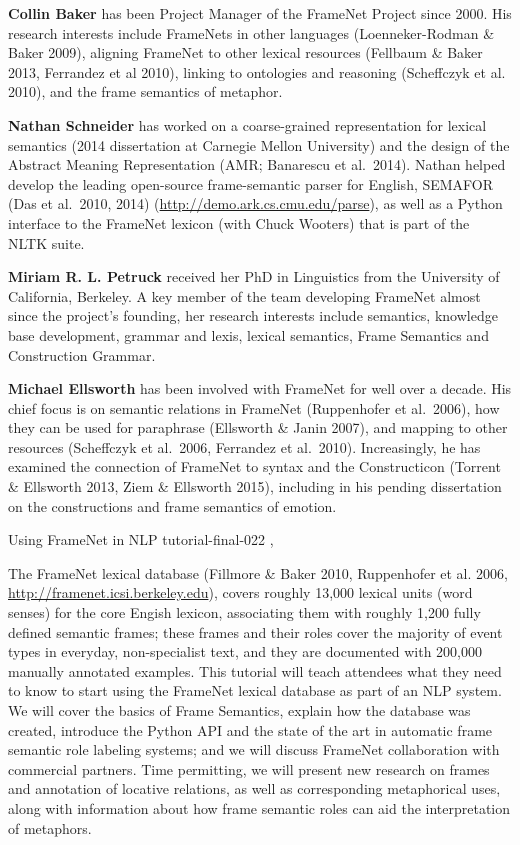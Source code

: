 \begin{bio}
  {\bfseries Collin Baker} has been Project Manager of the FrameNet Project since 2000. His research interests include FrameNets in other languages (Loenneker-Rodman \& Baker 2009), aligning FrameNet to other lexical resources (Fellbaum \& Baker 2013, Ferrandez et al 2010), linking to ontologies and reasoning (Scheffczyk et al. 2010), and the frame semantics of metaphor.

  {\bfseries Nathan Schneider} has worked on a coarse-grained representation for lexical semantics (2014 dissertation at Carnegie Mellon University) and the design of the Abstract Meaning Representation (AMR; Banarescu et al.\ 2014). Nathan helped develop the leading open-source frame-semantic parser for English, SEMAFOR (Das et al.\ 2010, 2014) (\url{http://demo.ark.cs.cmu.edu/parse}), as well as a Python interface to the FrameNet lexicon (with Chuck Wooters) that is part of the NLTK suite.

  {\bfseries Miriam R. L. Petruck} received her PhD in Linguistics from the University of California, Berkeley. A key member of the team developing FrameNet almost since the project’s founding, her research interests include semantics, knowledge base development, grammar and lexis, lexical semantics, Frame Semantics and Construction Grammar.

  {\bfseries Michael Ellsworth}  has been involved with FrameNet for well over a decade. His chief focus is on semantic relations in FrameNet (Ruppenhofer et al.\ 2006), how they can be used for paraphrase (Ellsworth \& Janin 2007), and mapping to other resources (Scheffczyk et al.\ 2006, Ferrandez et al.\ 2010). Increasingly, he has examined the connection of FrameNet to syntax and the Constructicon (Torrent \& Ellsworth 2013, Ziem \& Ellsworth 2015), including in his pending dissertation on the constructions and frame semantics of emotion.
\end{bio}

\begin{tutorial}
  {Using FrameNet in NLP}
  {tutorial-final-022}
  {\daydateyear, \tutorialafternoontime}
  {\TutLocF}

The FrameNet lexical database (Fillmore \& Baker 2010, Ruppenhofer et
al. 2006, \url{http://framenet.icsi.berkeley.edu}), covers roughly
13,000 lexical units (word senses) for the core Engish lexicon,
associating them with roughly 1,200 fully defined semantic frames;
these frames and their roles cover the majority of event types in
everyday, non-specialist text, and they are documented with 200,000
manually annotated examples. This tutorial will teach attendees what
they need to know to start using the FrameNet lexical database as part
of an NLP system. We will cover the basics of Frame Semantics, explain
how the database was created, introduce the Python API and the state
of the art in automatic frame semantic role labeling systems; and we
will discuss FrameNet collaboration with commercial partners. Time
permitting, we will present new research on frames and annotation of
locative relations, as well as corresponding metaphorical uses, along
with information about how frame semantic roles can aid the
interpretation of metaphors.

\end{tutorial} 
